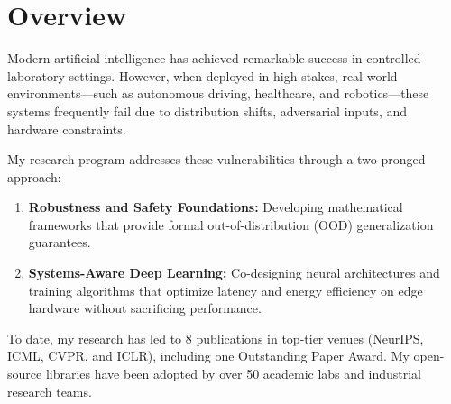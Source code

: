 \section{Overview}
Modern artificial intelligence has achieved remarkable success in controlled laboratory settings. However, when deployed in high-stakes, real-world environments---such as autonomous driving, healthcare, and robotics---these systems frequently fail due to distribution shifts, adversarial inputs, and hardware constraints. 

My research program addresses these vulnerabilities through a two-pronged approach:
\begin{enumerate}
  \item \textbf{Robustness and Safety Foundations:} Developing mathematical frameworks that provide formal out-of-distribution (OOD) generalization guarantees.
  \item \textbf{Systems-Aware Deep Learning:} Co-designing neural architectures and training algorithms that optimize latency and energy efficiency on edge hardware without sacrificing performance.
\end{enumerate}
To date, my research has led to 8 publications in top-tier venues (NeurIPS, ICML, CVPR, and ICLR), including one Outstanding Paper Award. My open-source libraries have been adopted by over 50 academic labs and industrial research teams.

